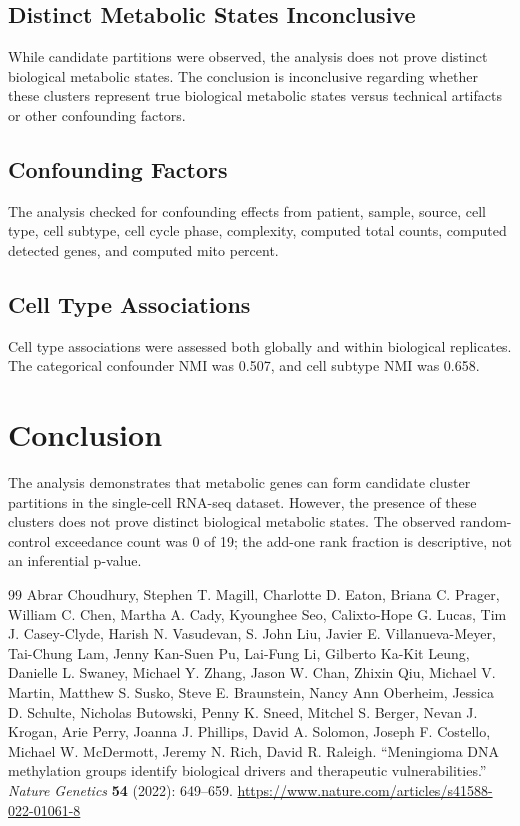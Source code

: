 \documentclass[sloppy]{article}
\begin{document}
\subsection{Distinct Metabolic States Inconclusive}
While candidate partitions were observed, the analysis does not prove distinct biological metabolic states. The conclusion is inconclusive regarding whether these clusters represent true biological metabolic states versus technical artifacts or other confounding factors.

\subsection{Confounding Factors}
The analysis checked for confounding effects from patient, sample, source, cell type, cell subtype, cell cycle phase, complexity, computed total counts, computed detected genes, and computed mito percent.

\subsection{Cell Type Associations}
Cell type associations were assessed both globally and within biological replicates. The categorical confounder NMI was 0.507, and cell subtype NMI was 0.658.

\section{Conclusion}

The analysis demonstrates that metabolic genes can form candidate cluster partitions in the single-cell RNA-seq dataset. However, the presence of these clusters does not prove distinct biological metabolic states. The observed random-control exceedance count was 0 of 19; the add-one rank fraction is descriptive, not an inferential p-value.

\begin{thebibliography}{99}
Abrar Choudhury, Stephen T. Magill, Charlotte D. Eaton, Briana C. Prager, William C. Chen, Martha A. Cady, Kyounghee Seo, Calixto-Hope G. Lucas, Tim J. Casey-Clyde, Harish N. Vasudevan, S. John Liu, Javier E. Villanueva-Meyer, Tai-Chung Lam, Jenny Kan-Suen Pu, Lai-Fung Li, Gilberto Ka-Kit Leung, Danielle L. Swaney, Michael Y. Zhang, Jason W. Chan, Zhixin Qiu, Michael V. Martin, Matthew S. Susko, Steve E. Braunstein, Nancy Ann Oberheim, Jessica D. Schulte, Nicholas Butowski, Penny K. Sneed, Mitchel S. Berger, Nevan J. Krogan, Arie Perry, Joanna J. Phillips, David A. Solomon, Joseph F. Costello, Michael W. McDermott, Jeremy N. Rich, David R. Raleigh. ``Meningioma DNA methylation groups identify biological drivers and therapeutic vulnerabilities.'' \textit{Nature Genetics} \textbf{54} (2022): 649--659. \url{https://www.nature.com/articles/s41588-022-01061-8}
\end{thebibliography}
\end{document}
